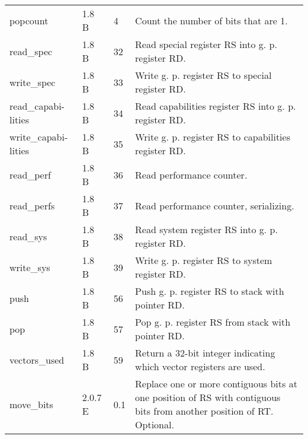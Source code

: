 \documentclass[forwardcom.tex]{subfiles}
\begin{document}
\begin{longtable} {|p{25mm}|p{14mm}|p{10mm}|p{95mm}|}
popcount      & 1.8 B &  4 & Count the number of bits that are 1.\\
read\_spec    & 1.8 B & 32  & Read special register RS into g. p. register RD. \\
write\_spec   & 1.8 B & 33  & Write g. p. register RS to special register RD. \\
read\_capabi-lities & 1.8 B & 34  & Read capabilities register RS into g. p. register RD. \\
write\_capabi-lities & 1.8 B & 35  & Write g. p. register RS to capabilities register RD. \\
read\_perf    & 1.8 B & 36  & Read performance counter. \\
read\_perfs   & 1.8 B & 37  & Read performance counter, serializing. \\
read\_sys     & 1.8 B & 38  & Read system register RS into g. p. register RD. \\
write\_sys    & 1.8 B & 39  & Write g. p. register RS to system register RD. \\

push          & 1.8 B & 56  & Push g. p. register RS to stack with pointer RD. \\
pop           & 1.8 B & 57  & Pop g. p. register RS from stack with pointer RD. \\
vectors\_used & 1.8 B & 59  & Return a 32-bit integer indicating which vector registers are used. \\

move\_bits    & 2.0.7 E & 0.1 & Replace one or more contiguous bits at one position of RS with contiguous bits from another position of RT. Optional. \\


\end{longtable}
\end{document}
